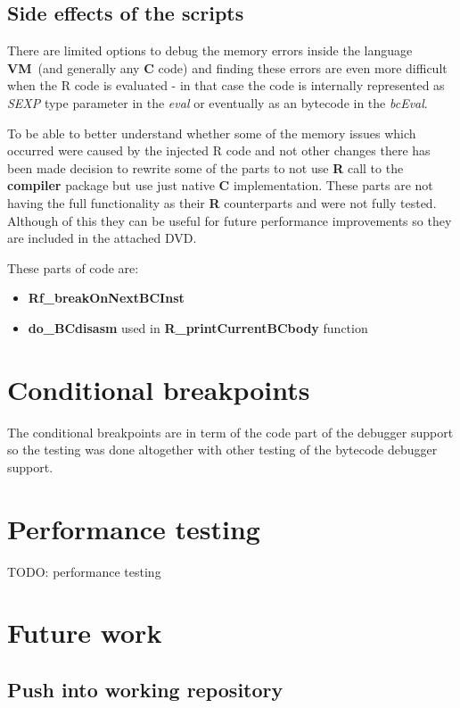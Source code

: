 \documentclass[thesis=M,english]{FITthesis}[2018/10/20]
\begin{document}
\subsection{Side effects of the scripts}

There are limited options to debug the memory errors inside the language \textbf{VM}~(and generally any \textbf{C} code) and finding these errors are even more difficult when the  R code is evaluated - in that case the code is internally represented as \textit{SEXP} type parameter in the \textit{eval} or eventually as an bytecode in the \textit{bcEval}. 

To be able to better understand whether some of the memory issues which occurred were caused by the injected R code and not other changes there has been made decision to rewrite some of the parts to not use \textbf{R} call to the \textbf{compiler} package but use just native \textbf{C} implementation. These parts are not having the full functionality as their \textbf{R} counterparts and were not fully tested. Although of this they can be useful for future performance improvements so they are included in the attached DVD.

These parts of code are:
\begin{itemize}
 \item \textbf{Rf{\_}breakOnNextBCInst}
 \item \textbf{do{\_}BCdisasm} used in \textbf{R{\_}printCurrentBCbody} function
\end{itemize}

\section{Conditional breakpoints}

The conditional breakpoints are in term of the code part of the debugger support so the testing was done altogether with other testing of the bytecode debugger support.

\section{Performance testing}

TODO: performance testing

\section{Future work}

\subsection{Push into working repository}
\end{document}
